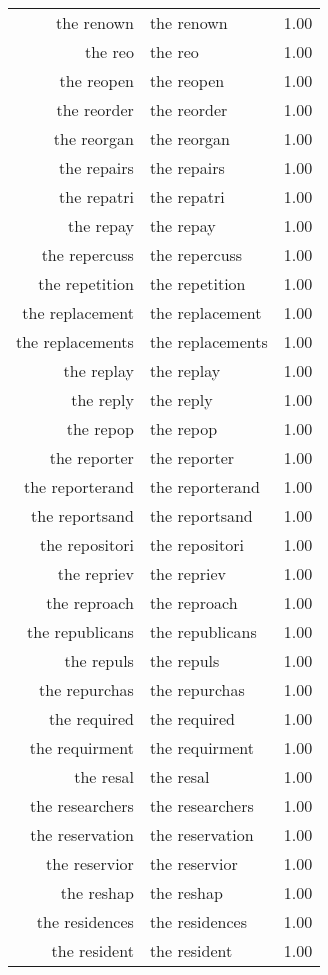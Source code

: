 \begin{table}[ht]
\begin{tabular}{rlr}
  the renown & the renown & 1.00 \\ 
  the reo & the reo & 1.00 \\ 
  the reopen & the reopen & 1.00 \\ 
  the reorder & the reorder & 1.00 \\ 
  the reorgan & the reorgan & 1.00 \\ 
  the repairs & the repairs & 1.00 \\ 
  the repatri & the repatri & 1.00 \\ 
  the repay & the repay & 1.00 \\ 
  the repercuss & the repercuss & 1.00 \\ 
  the repetition & the repetition & 1.00 \\ 
  the replacement & the replacement & 1.00 \\ 
  the replacements & the replacements & 1.00 \\ 
  the replay & the replay & 1.00 \\ 
  the reply & the reply & 1.00 \\ 
  the repop & the repop & 1.00 \\ 
  the reporter & the reporter & 1.00 \\ 
  the reporterand & the reporterand & 1.00 \\ 
  the reportsand & the reportsand & 1.00 \\ 
  the repositori & the repositori & 1.00 \\ 
  the repriev & the repriev & 1.00 \\ 
  the reproach & the reproach & 1.00 \\ 
  the republicans & the republicans & 1.00 \\ 
  the repuls & the repuls & 1.00 \\ 
  the repurchas & the repurchas & 1.00 \\ 
  the required & the required & 1.00 \\ 
  the requirment & the requirment & 1.00 \\ 
  the resal & the resal & 1.00 \\ 
  the researchers & the researchers & 1.00 \\ 
  the reservation & the reservation & 1.00 \\ 
  the reservior & the reservior & 1.00 \\ 
  the reshap & the reshap & 1.00 \\ 
  the residences & the residences & 1.00 \\ 
  the resident & the resident & 1.00 \\ 

\end{tabular}
\end{table}
